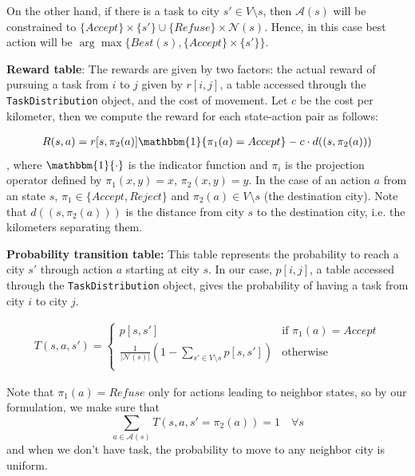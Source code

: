 \documentclass[11pt]{article}
\begin{document}
On the other hand, if there is a task to city $s'\in V\setminus s$, then $\mathcal{A}(s)$ will be constrained to $\{Accept\} \times \{s'\} \cup \{Refuse\} \times \mathcal{N}(s)$. Hence, in this case best action will be $\arg\max \{Best(s), \{Accept\} \times \{s'\}\}$. 

\textbf{Reward table}: The rewards are given by two factors: the actual reward of pursuing a task from $i$ to $j$ given by $r[i,j]$, a table accessed through the \texttt{TaskDistribution} object, and the cost of movement. Let $c$ be the cost per kilometer, then we compute the reward for each state-action pair as follows:

\begin{align}
    R(s, a) = r[s, \pi_2(a)] \mathbbm{1}\{\pi_1(a) = Accept\}- c \cdot d((s, \pi_2(a)))
\end{align}
, where $\mathbbm{1}\{\cdot\}$ is the indicator function and $\pi_i$ is the projection operator defined by $\pi_1(x, y) = x$, $\pi_2(x, y) = y$. In the case of an action $a$ from an state $s$, $\pi_1\in \{Accept, Reject\}$ and $\pi_2(a) \in V \setminus s$ (the destination city). Note that $d((s, \pi_2(a)))$ is the distance from city $s$ to the destination city, i.e. the kilometers separating them.


\textbf{Probability transition table:} This table represents the probability to reach a city $s'$ through action $a$ starting at city $s$. In our case, $p[i,j]$, a table accessed through the \texttt{TaskDistribution} object, gives the probability of having a task from city $i$ to city $j$.

\begin{align}
    T(s,a,s')=
    \begin{cases}
        p[s,s'] & \text{if } \pi_1(a)=Accept \\
        \frac{1}{|\mathcal{N}(s)|}(1 - \sum_{s'\in V\setminus s} p[s,s']) &\text{otherwise}\\
    \end{cases}
\end{align}

Note that $\pi_1(a)=Refuse$ only for actions leading to neighbor states, so by our formulation, we make sure that
\begin{displaymath}
    \sum_{a \in\mathcal{A}(s)} T(s,a,s'=\pi_2(a))=1 \quad  \forall s
\end{displaymath}
and when we don't have task, the probability to move to any neighbor city is uniform.
\end{document}
